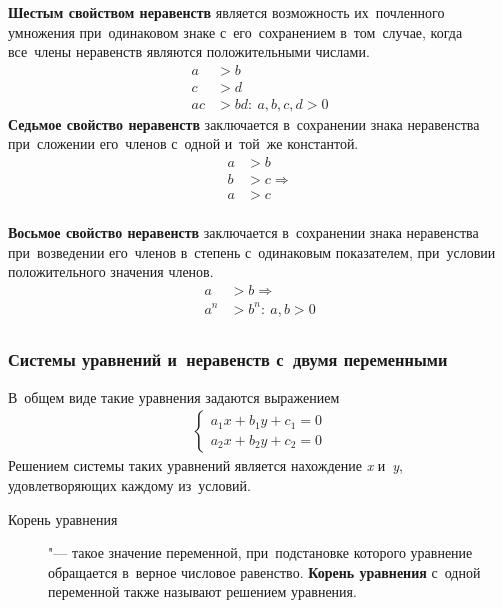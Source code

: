 \documentclass[]{scrartcl}
\begin{document}
\textbf{Шестым свойством неравенств} является возможность их~почленного умножения при~одинаковом знаке с~его~сохранением в~том~случае, когда все~члены неравенств являются положительными числами.
\begin{equation}\label{eq:enequalities-property6}
\begin{aligned}
a&>b \\
c&>d \\
ac&>bd:\ a,b,c,d>0
\end{aligned}
\end{equation}
\textbf{Седьмое свойство неравенств} заключается в~сохранении знака неравенства при~сложении его~членов с~одной и~той~же константой.
\begin{equation}\label{eq:enequalities-property7}
\begin{aligned}
a&>b \\
b&>c \Rightarrow \\
a&>c\\
\end{aligned}
\end{equation}

\textbf{Восьмое свойство неравенств} заключается в~сохранении знака неравенства при~возведении его~членов в~степень с~одинаковым показателем, при~условии положительного значения членов.
\begin{equation}\label{eq:enequalities-property8}
\begin{aligned}
a&>b \Rightarrow\\
a^n&>b^n:\ a,b>0\\
\end{aligned}
\end{equation}

\subsubsection{Системы уравнений и~неравенств с~двумя переменными}\label{two-unknown-system}

В~общем виде такие уравнения задаются выражением
\begin{equation}\label{eq:systems-linear-equations}
\begin{aligned}
\begin{cases}
a_{1}x+b_{1}y+c_{1}=0\\
a_{2}x+b_{2}y+c_{2}=0
\end{cases}
\end{aligned}
\end{equation}
Решением системы таких уравнений является нахождение \textit{x} и~\textit{y}, удовлетворяющих каждому из~условий. 
\begin{description}
	\item[Корень уравнения] "--- такое значение переменной, при~подстановке которого уравнение обращается в~верное числовое равенство. \textbf{Корень уравнения} с~одной переменной также называют решением уравнения.
\end{description}
\end{document}
